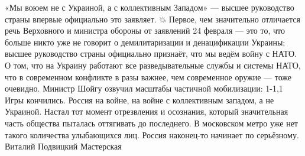 «Мы воюем не с Украиной, а с коллективным Западом» — высшее руководство страны впервые официально это заявляет.
💥 Первое, чем значительно отличается речь Верховного и министра обороны от заявлений 24 февраля — это то, что больше никто уже не говорит о демилитаризации и денацификации Украины; высшее руководство страны официально признаёт, что мы ведём войну с НАТО.
О том, что на Украину работают все разведывательные службы и системы НАТО, что в современном конфликте в разы важнее, чем современное оружие — тоже очевидно. Министр Шойгу озвучил масштабы частичной мобилизации: 1-1,1%
Игры кончились. Россия на войне, на войне с коллективным западом, а не Украиной. Настал тот момент отрезвления и осознания, который значительная часть общества пыталась оттягивать до последнего.
В московском метро уже нет такого количества улыбающихся лиц. Россия наконец-то начинает по серьёзному.
Виталий Подвицкий Мастерская
